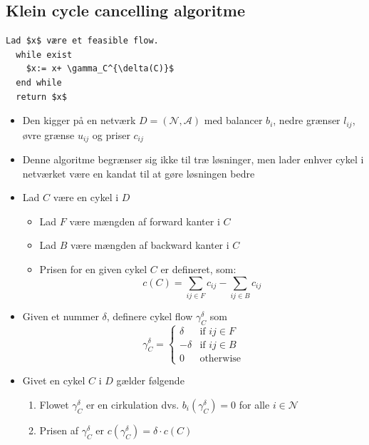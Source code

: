 \subsection{Klein cycle cancelling algoritme}
\begin{lstlisting}[mathescape=true]
  Lad $x$ være et feasible flow.
  while exist
    $x:= x+ \gamma_C^{\delta(C)}$
  end while
  return $x$
\end{lstlisting}
\begin{itemize}
	\item Den kigger på en netværk $D= (\mathcal N, \mathcal A)$ med balancer $b_i$, nedre grænser $l_{ij}$, øvre grænse $u_{ij}$ og priser $c_{ij}$
  \item Denne algoritme begrænser sig ikke til træ løsninger, men lader enhver cykel i netværket være en kandat til at gøre løsningen bedre
  \item Lad $C$ være en cykel i $D$ 
  \begin{itemize}
  	\item Lad $F$ være mængden af forward kanter i $C$
    \item Lad $B$ være mængden af backward kanter i $C$
    \item Prisen for en given cykel $C$ er defineret, som:
    \begin{equation*}
      c(C) = \sum_{ij \in F} c_{ij} - \sum_{ij\in B} c_{ij}
    \end{equation*}
  \end{itemize}
  \item Given et nummer $\delta$, definere cykel flow $\gamma_C^\delta$ som
  \begin{equation*}
    \gamma_C^\delta =
      \begin{cases}
        \mbox{$\delta$} & \mbox{if $ij \in F$} \\
        \mbox{$-\delta$} & \mbox{if $ij \in B$} \\
        \mbox{$0$} & \mbox{otherwise} 
      \end{cases}
  \end{equation*}
  \item Givet en cykel $C$ i $D$ gælder følgende
  \begin{enumerate}
  	\item Flowet $\gamma_C^\delta$ er en cirkulation dvs. $b_i(\gamma_C^\delta) = 0$ for alle $i \in \mathcal N$
	  \item Prisen af $\gamma_C^\delta$ er $c(\gamma_C^\delta) = \delta \cdot c(C)$
  \end{enumerate}

\end{itemize}
